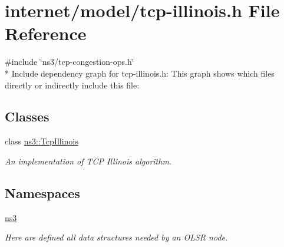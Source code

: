 \hypertarget{tcp-illinois_8h}{}\section{internet/model/tcp-\/illinois.h File Reference}
\label{tcp-illinois_8h}
{\ttfamily \#include \char`\"{}ns3/tcp-\/congestion-\/ops.\+h\char`\"{}}\\*
Include dependency graph for tcp-\/illinois.h\+:
This graph shows which files directly or indirectly include this file\+:
\subsection*{Classes}
\begin{DoxyCompactItemize}
\item 
class \hyperlink{classns3_1_1TcpIllinois}{ns3\+::\+Tcp\+Illinois}
\begin{DoxyCompactList}\small\item\em An implementation of T\+CP Illinois algorithm. \end{DoxyCompactList}\end{DoxyCompactItemize}
\subsection*{Namespaces}
\begin{DoxyCompactItemize}
\item 
 \hyperlink{namespacens3}{ns3}
\begin{DoxyCompactList}\small\item\em Here are defined all data structures needed by an O\+L\+SR node. \end{DoxyCompactList}\end{DoxyCompactItemize}
